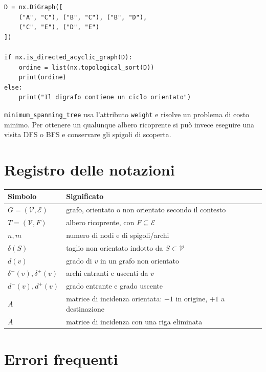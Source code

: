 \documentclass[11pt,a4paper]{article}
\newcommand{\V}{\mathcal{V}}
\newcommand{\E}{\mathcal{E}}
\newcommand{\deltaout}{\delta^{+}}
\newcommand{\deltain}{\delta^{-}}
\begin{document}
\begin{lstlisting}[style=python,caption={Riconoscimento di un DAG e ordinamento topologico}]
D = nx.DiGraph([
    ("A", "C"), ("B", "C"), ("B", "D"),
    ("C", "E"), ("D", "E")
])

if nx.is_directed_acyclic_graph(D):
    ordine = list(nx.topological_sort(D))
    print(ordine)
else:
    print("Il digrafo contiene un ciclo orientato")
\end{lstlisting}

\begin{warningbox}
\texttt{minimum\_spanning\_tree} usa l'attributo \texttt{weight} e risolve un problema di costo minimo. Per ottenere un qualunque albero ricoprente si può invece eseguire una visita DFS o BFS e conservare gli spigoli di scoperta.
\end{warningbox}

\section{Registro delle notazioni}

\begin{notationbox}
\begin{center}
\begin{tabular}{ll}
\toprule
Simbolo & Significato\\
\midrule
$G=(\V,\E)$ & grafo, orientato o non orientato secondo il contesto\\
$T=(\V,F)$ & albero ricoprente, con $F\subseteq\E$\\
$n,m$ & numero di nodi e di spigoli/archi\\
$\delta(S)$ & taglio non orientato indotto da $S\subset\V$\\
$d(v)$ & grado di $v$ in un grafo non orientato\\
$\deltain(v),\deltaout(v)$ & archi entranti e uscenti da $v$\\
$d^-(v),d^+(v)$ & grado entrante e grado uscente\\
$A$ & matrice di incidenza orientata: $-1$ in origine, $+1$ a destinazione\\
$\bar A$ & matrice di incidenza con una riga eliminata\\
\bottomrule
\end{tabular}
\end{center}
\end{notationbox}

\section{Errori frequenti}
\end{document}
